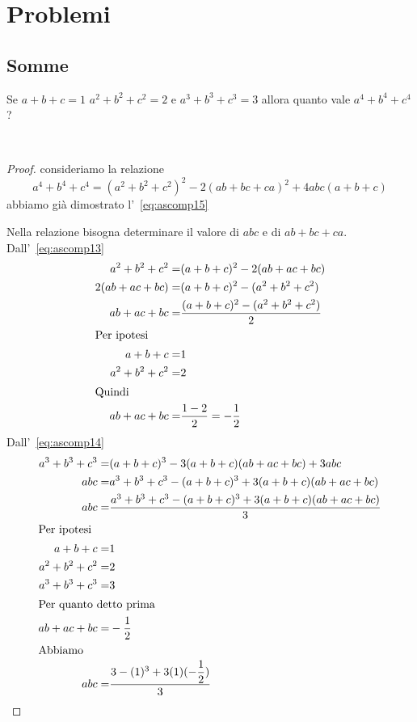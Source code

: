 \chapter{Problemi}
\section{Somme}
\begin{prob}
Se $a+b+c=1$ $a^2+b^2+c^2=2$ e $a^3+b^3+c^3=3$ allora quanto vale $a^4+b^4+c^4$?
\end{prob}~\cite{Gregorio2021}
\begin{proof}
consideriamo la relazione \[a^4+b^4+c^4=(a^2+b^2+c^2)^2-2(ab+bc+ca)^2+4abc(a+b+c)\] abbiamo già dimostrato l'~\vref{eq:ascomp15}

Nella relazione bisogna determinare il valore di $abc$ e di $ab+bc+ca$.
Dall'~\vref{eq:ascomp13}
\begin{align*}
a^2+b^2+c^2=&(a+b+c)^2-2(ab+ac+bc)\\
2(ab+ac+bc)=&(a+b+c)^2-(a^2+b^2+c^2)\\
ab+ac+bc=&\dfrac{(a+b+c)^2-(a^2+b^2+c^2)}{2}\\
\intertext{Per ipotesi}
a+b+c=&1\\
a^2+b^2+c^2=&2\\
\intertext{Quindi}
ab+ac+bc=&\dfrac{1-2}{2}=-\dfrac{1}{2}\\
\end{align*}
Dall'~\vref{eq:ascomp14}
\begin{align*}
	a^3+b^3+c^3=&{}(a+b+c)^3-3(a+b+c)(ab+ac+bc)+3abc\\
	abc=&a^3+b^3+c^3-(a+b+c)^3+3(a+b+c)(ab+ac+bc)\\
	abc=&	\dfrac{a^3+b^3+c^3-(a+b+c)^3+3(a+b+c)(ab+ac+bc)}{3}\\
	\intertext{Per ipotesi}
	a+b+c=&1\\
	a^2+b^2+c^2=&2\\
	a^3+b^3+c^3=&3\\
	\intertext{Per quanto detto prima}
	ab+ac+bc=&-\dfrac{1}{2}\\
	\intertext{Abbiamo}
	abc=&	\dfrac{3-(1)^3+3(1)(-\dfrac{1}{2})}{3}\\
\end{align*}
\end{proof}
